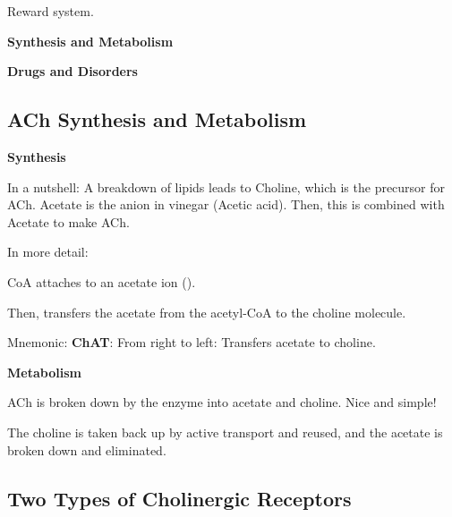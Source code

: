 \begin{coloredlist}
\begin{coloredlist}
\begin{coloredlist}
\begin{coloredlist}
                \item Reward system.
            \end{coloredlist}
        \end{coloredlist}
    \end{coloredlist}
    \item \textbf{Synthesis and Metabolism}
    \item \textbf{Drugs and Disorders}
\end{coloredlist}

\subsection{ACh Synthesis and Metabolism}

\begin{coloredlist}
    \item \textbf{Synthesis}
    \begin{coloredlist}
        \item In a nutshell: A breakdown of lipids leads to Choline, which is the precursor for ACh. Acetate is the anion in vinegar (Acetic acid). Then, this is combined with Acetate to make ACh.
        \item In more detail:
        \begin{coloredlist}
            \item CoA attaches to an acetate ion ().
            \item Then,  transfers the acetate from the acetyl-CoA to the choline molecule.
            \item Mnemonic: \textbf{ChAT}: From right to left: Transfers acetate to choline.
        \end{coloredlist}
    \end{coloredlist}
    \item \textbf{Metabolism}
    \begin{coloredlist}
        \item ACh is broken down by the enzyme  into acetate and choline. Nice and simple!
        \item The choline is taken back up by active transport and reused, and the acetate is broken down and eliminated.
    \end{coloredlist}
\end{coloredlist}

\subsection{Two Types of Cholinergic Receptors}

